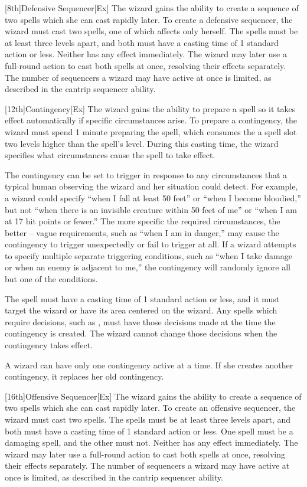 [8th]{Defensive Sequencer}[Ex]
The wizard gains the ability to create a sequence of two spells which she can cast rapidly later.
To create a defensive sequencer, the wizard must cast two spells, one of which affects only herself.
The spells must be at least three levels apart, and both must have a casting time of 1 standard action or less.
Neither has any effect immediately.
The wizard may later use a full-round action to cast both spells at once, resolving their effects separately.
The number of sequencers a wizard may have active at once is limited, as described in the cantrip sequencer ability.

[12th]{Contingency}[Ex]
The wizard gains the ability to prepare a spell so it takes effect automatically if specific circumstances arise.
To prepare a contingency, the wizard must spend 1 minute preparing the spell, which consumes the a spell slot two levels higher than the spell's level.
During this casting time, the wizard specifies what circumstances cause the spell to take effect.

The contingency can be set to trigger in response to any circumstances that a typical human observing the wizard and her situation could detect.
For example, a wizard could specify ``when I fall at least 50 feet'' or ``when I become bloodied,'' but not ``when there is an invisible creature within 50 feet of me'' or ``when I am at 17 hit points or fewer.'' The more specific the required circumstances, the better -- vague requirements, such as ``when I am in danger,'' may cause the contingency to trigger unexpectedly or fail to trigger at all.
If a wizard attempts to specify multiple separate triggering conditions, such as ``when I take damage or when an enemy is adjacent to me,'' the contingency will randomly ignore all but one of the conditions.

The spell must have a casting time of 1 standard action or less, and it must target the wizard or have its area centered on the wizard.
Any spells which require decisions, such as , must have those decisions made at the time the contingency is created.
The wizard cannot change those decisions when the contingency takes effect.

A wizard can have only one contingency active at a time.
If she creates another contingency, it replaces her old contingency.

[16th]{Offensive Sequencer}[Ex]
The wizard gains the ability to create a sequence of two spells which she can cast rapidly later.
To create an offensive sequencer, the wizard must cast two spells.
The spells must be at least three levels apart, and both must have a casting time of 1 standard action or less.
One spell must be a damaging spell, and the other must not.
Neither has any effect immediately.
The wizard may later use a full-round action to cast both spells at once, resolving their effects separately.
The number of sequencers a wizard may have active at once is limited, as described in the cantrip sequencer ability.

